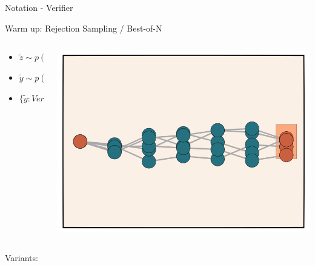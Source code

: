 \documentclass[14pt,aspectratio=169]{beamer}
\begin{document}
\begin{frame}{Notation - Verifier}
	\begin{itemize}
		\item $\text{Ver} : \mathcal{Y} \rightarrow \{0, 1}$
		\item Examples: Regular expression for math, unit test for code.
	\end{itemize}
\end{frame}


\begin{frame}{Warm up: Rejection Sampling / Best-of-N}
	\begin{columns}
		\begin{column}{0.5\linewidth}
			\begin{itemize}
				\item $\tilde{z} \sim p(z | x)$
				\item $\tilde{y} \sim p(y | x, \tilde{z})$
				\item $\{\tilde{y} : Ver(\tilde{y}) \}$
			\end{itemize}
		\end{column}
		\begin{column}{0.5\linewidth}
			\includegraphics[width=\textwidth]{images/reject.png}
		\end{column}
	\end{columns}
\end{frame}

\begin{frame}{Variants:}
\end{frame}
\end{document}

